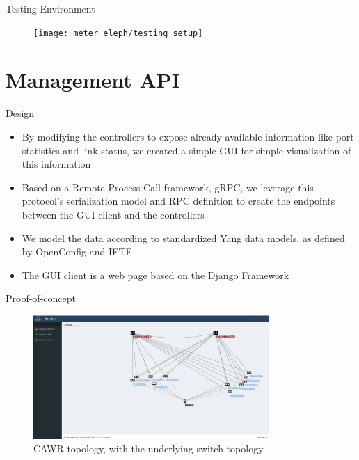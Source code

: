 \documentclass{beamer}
\begin{document}
\begin{frame}{Testing Environment}
    \begin{figure}
        \texttt{[image: meter\_eleph/testing\_setup]}
    \end{figure}
\end{frame}

\section{Management API}

\begin{frame}{Design}
    \begin{itemize}
        \item By modifying the controllers to expose already available information like port statistics
            and link status, we created a simple GUI for simple visualization of this information
            \pause
        \item Based on a Remote Process Call framework, gRPC, we leverage this protocol's serialization model
            and RPC definition to create the endpoints between the GUI client and the controllers
            \pause
        \item We model the data according to standardized Yang data models, as defined by OpenConfig and IETF
            \pause
        \item The GUI client is a web page based on the Django Framework
    \end{itemize}
\end{frame}

\begin{frame}{Proof-of-concept}
    \begin{figure}[!tbph]
      \centering
      \includegraphics[width=0.8\textwidth]{bisdn/cawr_gui}
      \caption {CAWR topology, with the underlying switch topology}
    \end{figure}
\end{frame}
\end{document}
